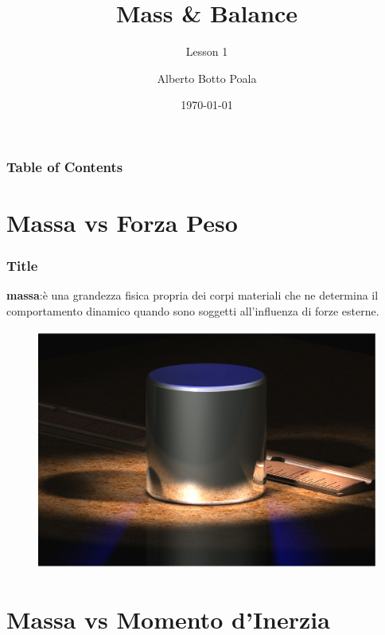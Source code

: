 \documentclass{beamer}
\title{Mass \& Balance}
\subtitle{Lesson 1}
\author{Alberto Botto Poala}
\institute{AeC Biella}
\date{\today}
\begin{document}
\begin{frame}
\titlepage
\end{frame} 

\begin{frame}
\frametitle{Table of Contents}
\tableofcontents
\end{frame} 

\section{Massa vs Forza Peso}
\begin{frame}
\frametitle{Title}
\textbf{massa}:è una grandezza fisica propria dei corpi materiali che ne determina il comportamento dinamico quando sono soggetti all'influenza di forze esterne.
\begin{figure}
\includegraphics[scale=0.1]{./images/1kg.pdf}
\end{figure}
\end{frame}

\section{Massa vs Momento d'Inerzia}
\end{document}
